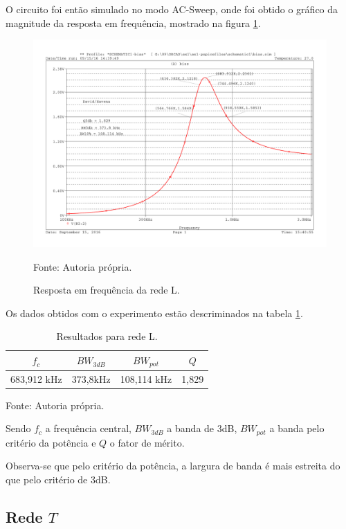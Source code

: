 O circuito foi então simulado no modo AC-Sweep, onde foi obtido o gráfico da magnitude da resposta em frequência, mostrado na figura \ref{f_rede_L_graph}.

\begin{figure}[H]
    \centering
    \caption{Resposta em frequência da rede L.}
    \includegraphics[scale=0.5]{Imagens/ex1/resf.pdf}
    \label{f_rede_L_graph}
    
    \small Fonte: Autoria própria.
\end{figure}

Os dados obtidos com o experimento estão descriminados na tabela \ref{tab:resl}.

\begin{table}[H]
    \centering
    \caption{Resultados para rede L.}
    \label{tab:resl}
    \begin{tabular}{cccc}
     \hline
     $f_c$ & $BW_{3dB}$ & $BW_{pot}$ & $Q$ \\
     \hline
      683,912 kHz & 373,8kHz & 108,114 kHz & 1,829 \\
     \hline
    \end{tabular}

    \small Fonte: Autoria própria.
\end{table}

Sendo $f_c$ a frequência central, $BW_{3dB}$ a banda de 3dB, $BW_{pot}$ a banda pelo critério da potência e $Q$ o fator de mérito.

Observa-se que pelo critério da potência, a largura de banda é mais estreita do que pelo critério de 3dB.
 
\subsection{Rede $T$}
 
